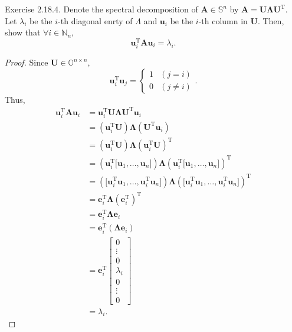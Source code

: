 \documentclass{article}
\theoremstyle{plain}
\begin{document}
\begin{itembox}[l]{Exercise 2.18.4.}
	Denote the spectral decomposition of $\bm{A} \in \mathbb{S}^n$ by $\bm{A} = \bm{U} \bm{\Lambda} \bm{U}^{\mathrm{T}}$.
	Let $\lambda_i$ be the $i$-th diagonal enrty of $\Lambda$ and $\bm{u}_i$ be the $i$-th column in $\bm{U}$.
	Then, show that $\forall i \in \mathbb{N}_n$,
	\begin{equation}
		\label{ex2184}
		\bm{u}_i^{\mathrm{T}} \bm{A} \bm{u}_i = \lambda_i .
	\end{equation}
\end{itembox}


\begin{proof}
	Since $\bm{U} \in \mathbb{O}^{n \times n} ,$
	\begin{equation*}
		\bm{u}_i^{\mathrm{T}} \bm{u}_j =
		\begin{cases}
			1 & (j=i)\\
			0 & (j \neq i)
		\end{cases} .
	\end{equation*}
	Thus,
	\begin{equation*}
		\begin{split}
			\bm{u}_i^{\mathrm{T}} \bm{A} \bm{u}_i &= \bm{u}_i^{\mathrm{T}} \bm{U} \bm{\Lambda} \bm{U}^{\mathrm{T}} \bm{u}_i \\
			&= (\bm{u}_i^{\mathrm{T}} \bm{U}) \bm{\Lambda} (\bm{U}^{\mathrm{T}} \bm{u}_i) \\
			&= (\bm{u}_i^{\mathrm{T}} \bm{U}) \bm{\Lambda} (\bm{u}_i^{\mathrm{T}} \bm{U})^{\mathrm{T}} \\
			&= (\bm{u}_i^{\mathrm{T}} \lbrack \bm{u}_1 , \ldots , \bm{u}_n \rbrack) \bm{\Lambda} (\bm{u}_i^{\mathrm{T}} \lbrack \bm{u}_1 , \ldots , \bm{u}_n \rbrack)^{\mathrm{T}} \\
			&= (\lbrack \bm{u}_i^{\mathrm{T}} \bm{u}_1 , \ldots , \bm{u}_i^{\mathrm{T}} \bm{u}_n \rbrack) \bm{\Lambda} (\lbrack \bm{u}_i^{\mathrm{T}} \bm{u}_1 , \ldots , \bm{u}_i^{\mathrm{T}} \bm{u}_n \rbrack)^{\mathrm{T}} \\
			&= \bm{e}_i^{\mathrm{T}} \bm{\Lambda} (\bm{e}_i^{\mathrm{T}})^{\mathrm{T}} \\
			&= \bm{e}_i^{\mathrm{T}} \bm{\Lambda} \bm{e}_i \\
			&= \bm{e}_i^{\mathrm{T}} (\bm{\Lambda} \bm{e}_i) \\
			&= \bm{e}_i^{\mathrm{T}}
			\begin{bmatrix}
				0 \\
				\vdots \\
				0 \\
				\lambda_i \\
				0 \\
				\vdots \\
				0
			\end{bmatrix} \\
			&= \lambda_i .
		\end{split}
	\end{equation*}
\end{proof}
\end{document}
